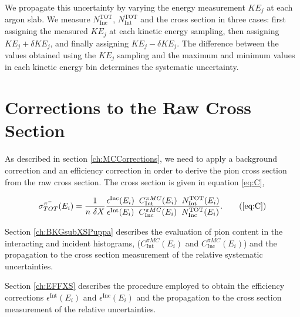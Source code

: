 We propagate this uncertainty  by varying the energy measurement $KE_{j}$ at each argon slab. We measure $N^{\text{TOT}}_{\text{Inc}}$,  $N^{\text{TOT}}_{\text{Int}}$ and the cross section  in three cases: first assigning the measured $KE_{j}$ at each kinetic energy sampling, then assigning $KE_{j} + \delta KE_{j}$, and finally assigning $KE_{j} - \delta KE_{j}$. The difference between the values obtained using the $KE_{j}$ sampling and the maximum and minimum values in each kinetic energy bin determines the systematic uncertainty.


\section{Corrections to the Raw Cross Section}\label{ch:PionXSCorrections}
As described in section \ref{ch:MCCorrections}, we need to apply a background correction and an efficiency correction in order to derive the pion cross section from the raw cross section.  The  cross section is given in equation \ref{eq:C}, 

\begin{equation}
   \sigma^{\pi^-}_{TOT}(E_{i})  = \frac{1}{n \text{ } \delta X}\frac{ \epsilon^{\text{Inc}}(E_i)  \hspace{0.2cm} C^{\pi MC}_{\text{Int}} (E_{i}) \hspace{0.2cm} N^{\text{TOT}}_{\text{Int}} (E_{i}) }{   \epsilon^{\text{Int}}(E_i) \hspace{0.2cm} C^{\pi MC}_{\text{Inc}} (E_{i}) \hspace{0.2cm}  N^{\text{TOT}}_{\text{Inc}} (E_{i})}.
 \tag{\ref{eq:C}}
\end{equation}

Section \ref{ch:BKGsubXSPuppa} describes the evaluation of pion content in the interacting and incident histograms, ($C^{\pi MC}_{\text{Int}} (E_{i})$  and  $C^{\pi MC}_{\text{Inc}} (E_{i})$) and the propagation to the cross section measurement of the relative systematic uncertainties.

Section \ref{ch:EFFXS} describes the procedure employed to obtain  the efficiency corrections $\epsilon^{\text{Int}}(E_i)$  and $\epsilon^{\text{Inc}}(E_i)$ and the propagation to the cross section measurement of the relative uncertainties.



